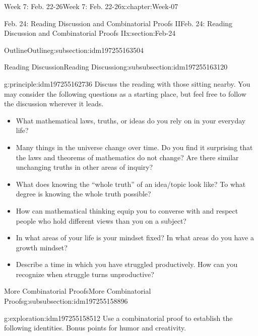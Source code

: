 \documentclass[oneside,10pt,]{book}
\numberwithin{equation}{section}
\begin{document}
\begin{chapterptx}{Week 7: Feb. 22-26}{}{Week 7: Feb. 22-26}{}{}{x:chapter:Week-07}
\begin{sectionptx}{Feb. 24: Reading Discussion and Combinatorial Proofs II}{}{Feb. 24: Reading Discussion and Combinatorial Proofs II}{}{}{x:section:Feb-24}
\typeout{************************************************}
%
\begin{subsectionptx}{Outline}{}{Outline}{}{}{g:subsection:idm197255163504}
%
%
\typeout{************************************************}
\typeout{************************************************}
%
\begin{subsubsectionptx}{Reading Discussion}{}{Reading Discussion}{}{}{g:subsubsection:idm197255163120}
\begin{principle}{}{}{g:principle:idm197255162736}%
Discuss the reading with those sitting nearby. You may consider the following questions as a starting place, but feel free to follow the discussion wherever it leads.%
%
\begin{itemize}[label=\textbullet]
\item{}What mathematical laws, truths, or ideas do you rely on in your everyday life?%
\item{}Many things in the universe change over time. Do you find it surprising that the laws and theorems of mathematics do not change? Are there similar unchanging truths in other areas of inquiry?%
\item{}What does knowing the ``whole truth'' of an idea\slash{}topic look like? To what degree is knowing the whole truth possible?%
\item{}How can mathematical thinking equip you to converse with and respect people who hold different views than you on a subject?%
\item{}In what areas of your life is your mindset fixed? In what areas do you have a growth mindset?%
\item{}Describe a time in which you have struggled productively. How can you recognize when struggle turns unproductive?%
\end{itemize}
\end{principle}
\end{subsubsectionptx}
%
%
\typeout{************************************************}
\typeout{************************************************}
%
\begin{subsubsectionptx}{More Combinatorial Proofs}{}{More Combinatorial Proofs}{}{}{g:subsubsection:idm197255158896}
\begin{exploration}{}{g:exploration:idm197255158512}%
Use a combinatorial proof to establish the following identities. Bonus points for humor and creativity.%
%
\begin{enumerate}

\end{enumerate}
\end{exploration}
\end{subsubsectionptx}
\end{subsectionptx}
\end{sectionptx}
\end{chapterptx}
\end{document}
